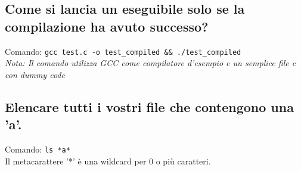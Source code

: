 \documentclass{article}
\begin{document}
\subsection{Come si lancia un eseguibile solo se la compilazione ha avuto successo?}
Comando: \texttt{gcc test.c -o test\_compiled \&\& ./test\_compiled}\\
\textit{Nota: Il comando utilizza GCC come compilatore d'esempio e un semplice file c con dummy code}

\subsection{Elencare tutti i vostri file che contengono una 'a'.}
Comando: \texttt{ls *a*}\\
Il metacarattere '*' è una wildcard per 0 o più caratteri.
\end{document}
